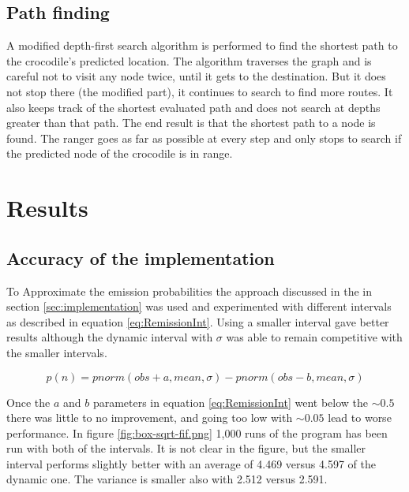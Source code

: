 \documentclass[12pt, a4paper]{article}
\begin{document}
\subsection{Path finding}
A modified depth-first search algorithm is performed to find the shortest path to the crocodile's predicted location. The algorithm traverses the graph and is careful not to visit any node twice, until it gets to the destination. But it does not stop there (the modified part), it continues to search to find more routes. It also keeps track of the shortest evaluated path and does not search at depths greater than that path. The end result is that the shortest path to a node is found. The ranger goes as far as possible at every step and only stops to search if the predicted node of the crocodile is in range.



\section{Results}

\subsection{Accuracy of the implementation}

To Approximate the emission probabilities the approach discussed in the in section \ref{sec:implementation} was used and experimented with different intervals as described in equation \ref{eq:RemissionInt}. Using a smaller interval gave better results although the dynamic interval with $\sigma$ was able to remain competitive with the smaller intervals.

\begin{equation}\label{eq:RemissionInt}
p(n) = pnorm(obs+a,mean,\sigma)-pnorm(obs-b,mean,\sigma)
\end{equation}

Once the $a$ and $b$ parameters in equation \ref{eq:RemissionInt} went below the $\sim0.5$ there was little to no improvement, and going too low with $\sim0.05$ lead to worse performance. In figure \ref{fig:box-sqrt-fif.png} 1,000 runs of the program has been run with both of the intervals. It is not clear in the figure, but the smaller interval performs slightly better with an average of 4.469 versus 4.597 of the dynamic one. The variance is smaller also with 2.512 versus 2.591. 
\end{document}
